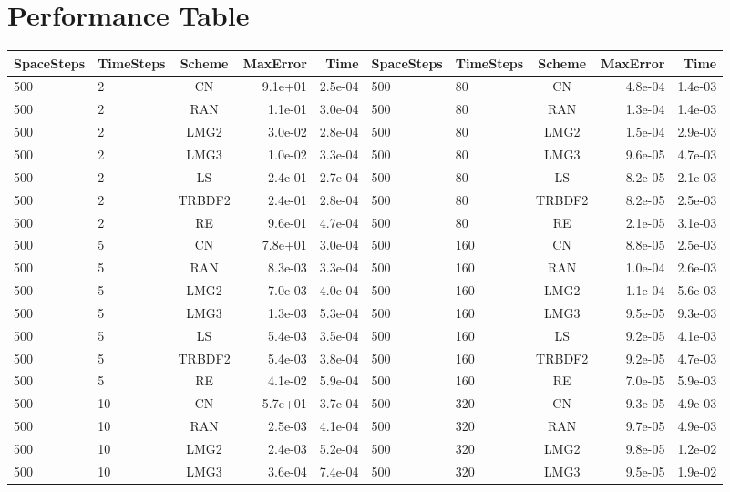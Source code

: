 \documentclass[]{rAMF2e}
\begin{document}
\section{Performance Table}
\begin{table}[h]
\begin{center}
\begin{tiny}
\begin{tabular}{|l|l|c|r|r||l|l|c|r|r|}
\hline
SpaceSteps & TimeSteps & Scheme & MaxError & Time & SpaceSteps & TimeSteps & Scheme & MaxError & Time\\ \hline
500 & 2 & CN & 9.1e+01 & 2.5e-04&      500 & 80 & CN & 4.8e-04 & 1.4e-03\\
500 & 2 & RAN & 1.1e-01 & 3.0e-04&     500 & 80 & RAN & 1.3e-04 & 1.4e-03\\
500 & 2 & LMG2 & 3.0e-02 & 2.8e-04&    500 & 80 & LMG2 & 1.5e-04 & 2.9e-03\\
500 & 2 & LMG3 & 1.0e-02 & 3.3e-04&    500 & 80 & LMG3 & 9.6e-05 & 4.7e-03\\
500 & 2 & LS & 2.4e-01 & 2.7e-04&      500 & 80 & LS & 8.2e-05 & 2.1e-03\\
500 & 2 & TRBDF2 & 2.4e-01 & 2.8e-04&  500 & 80 & TRBDF2 & 8.2e-05 & 2.5e-03\\
500 & 2 & RE & 9.6e-01 & 4.7e-04&      500 & 80 & RE & 2.1e-05 & 3.1e-03\\
500 & 5 & CN & 7.8e+01 & 3.0e-04&      500 & 160 & CN & 8.8e-05 & 2.5e-03\\
500 & 5 & RAN & 8.3e-03 & 3.3e-04&     500 & 160 & RAN & 1.0e-04 & 2.6e-03\\
500 & 5 & LMG2 & 7.0e-03 & 4.0e-04&    500 & 160 & LMG2 & 1.1e-04 & 5.6e-03\\
500 & 5 & LMG3 & 1.3e-03 & 5.3e-04&    500 & 160 & LMG3 & 9.5e-05 & 9.3e-03\\
500 & 5 & LS & 5.4e-03 & 3.5e-04&      500 & 160 & LS & 9.2e-05 & 4.1e-03\\
500 & 5 & TRBDF2 & 5.4e-03 & 3.8e-04&  500 & 160 & TRBDF2 & 9.2e-05 & 4.7e-03\\
500 & 5 & RE & 4.1e-02 & 5.9e-04&      500 & 160 & RE & 7.0e-05 & 5.9e-03\\
500 & 10 & CN & 5.7e+01 & 3.7e-04&     500 & 320 & CN & 9.3e-05 & 4.9e-03\\
500 & 10 & RAN & 2.5e-03 & 4.1e-04&    500 & 320 & RAN & 9.7e-05 & 4.9e-03\\
500 & 10 & LMG2 & 2.4e-03 & 5.2e-04&   500 & 320 & LMG2 & 9.8e-05 & 1.2e-02\\
500 & 10 & LMG3 & 3.6e-04 & 7.4e-04&   500 & 320 & LMG3 & 9.5e-05 & 1.9e-02\\

\end{tabular}
\end{tiny}
\end{center}
\end{table}
\end{document}
